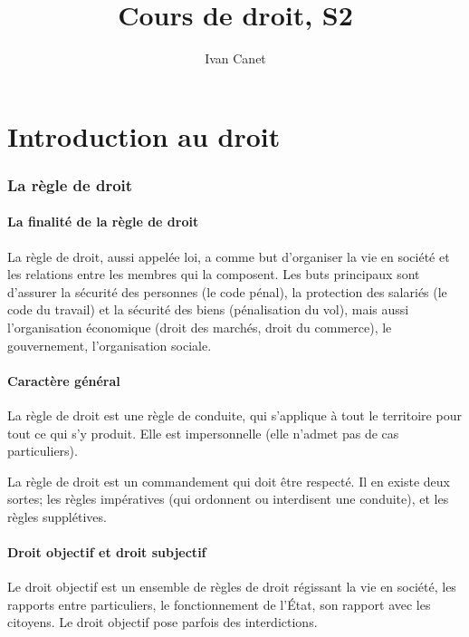 \documentclass[10pt,a4paper]{article}
\begin{document}
\title{Cours de droit, S2}
\author{Ivan Canet}
\maketitle
\tableofcontents

\part{Introduction au droit}

\section{La règle de droit}

\subsection{La finalité de la règle de droit}

La règle de droit, aussi appelée loi, a comme but d'organiser la vie en société et les relations entre les membres qui la composent. Les buts principaux sont d'assurer la sécurité des personnes (le code pénal), la protection des salariés (le code du travail) et la sécurité des biens (pénalisation du vol), mais aussi l'organisation économique (droit des marchés, droit du commerce), le gouvernement, l'organisation sociale.

\subsection{Caractère général}

La règle de droit est une règle de conduite, qui s'applique à tout le territoire pour tout ce qui s'y produit. Elle est impersonnelle (elle n'admet pas de cas particuliers).

La règle de droit est un commandement qui doit être respecté. Il en existe deux sortes; les règles impératives (qui ordonnent ou interdisent une conduite), et les règles supplétives.

\subsection{Droit objectif et droit subjectif}

Le droit objectif est un ensemble de règles de droit régissant la vie en société, les rapports entre particuliers, le fonctionnement de l'État, son rapport avec les citoyens. Le droit objectif pose parfois des interdictions.
\end{document}
